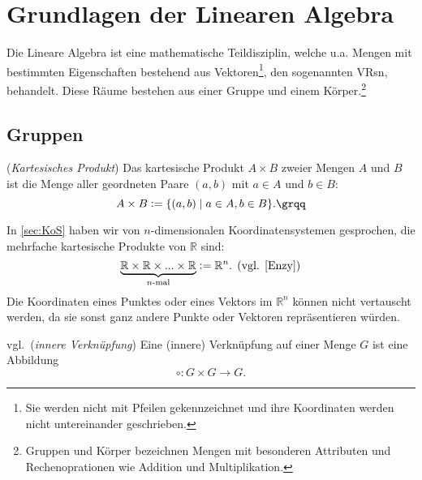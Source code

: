 \chapter{Grundlagen der Linearen Algebra}
\label{sec:LA}
Die Lineare Algebra ist eine mathematische Teildisziplin, welche u.a. Mengen mit bestimmten Eigenschaften bestehend aus Vektoren\footnote{Sie werden nicht mit Pfeilen gekennzeichnet und ihre Koordinaten werden nicht untereinander geschrieben. }, den sogenannten \aclp{VR}n, behandelt. Diese Räume bestehen aus einer Gruppe und einem Körper.\footnote{Gruppen und Körper bezeichnen Mengen mit besonderen Attributen und Rechenoprationen wie Addition und Multiplikation.}
\section{Gruppen}
\label{sec:Gruppen}

\theoremstyle{definition}
\begin{definition}\cite[S. 28]{Enzy} (\emph{Kartesisches Produkt})
{\glqq}Das kartesische Produkt $A\times B$ zweier Mengen $A$ und $B$ ist die Menge aller geordneten Paare $(a,b)$ mit $a \in A$ und $b \in B$: \[A \times B \vcentcolon= \{(a,b) \mid a \in A, b \in B\} \text{.{\grqq}}\]
\end{definition}

\begin{example}\label{kart}
In \ref{sec:KoS} haben wir von $n$-dimensionalen Koordinatensystemen gesprochen, die mehrfache kartesische Produkte von $\mathbb{R}$ sind:
\[\underbrace{\mathbb{R} \times \mathbb{R} \times ... \times \mathbb{R}}_{n\text{-mal}} \vcentcolon= \mathbb{R}^n \text{. (vgl. \cite[S. 28]{Enzy})}\]
Die Koordinaten eines Punktes oder eines Vektors im $\mathbb{R}^n$ können nicht vertauscht werden, da sie sonst ganz andere Punkte oder Vektoren repräsentieren würden.
\end{example}

\theoremstyle{definition}
\begin{definition}vgl.\,\cite[S. 19, 4.1]{Skript} (\emph{innere Verknüpfung}) Eine (innere) Verknüpfung auf einer Menge $G$ ist eine Abbildung
\[ \circ: G \times G \rightarrow G \text{.} \] 
\end{definition}

